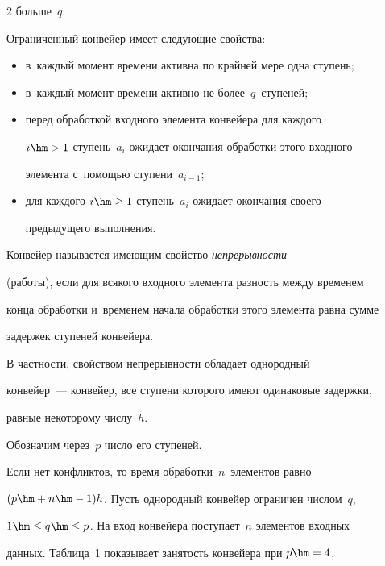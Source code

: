 \begin{multicols}{2}
больше~$q$. 


  


  Ограниченный конвейер имеет следующие свойства:


  \begin{itemize}


\item в~каждый момент времени активна по крайней мере одна ступень;


\item в~каждый момент времени активно не более~$q$~ступеней;


\item перед обработкой входного элемента конвейера для каждого 


$i\hm>1$ ступень~$a_i$ ожидает окончания обработки этого входного 


элемента с~помощью ступени~$a_{i-1}$; 


\item для каждого $i\hm\geq 1$ ступень~$a_i$ ожидает окончания своего 


предыдущего выполнения.


\end{itemize}





  Конвейер называется имеющим свойство \textit{непрерывности} 


(работы), если для всякого входного элемента разность между временем 


конца обработки и~временем начала обработки этого элемента равна сумме 


задержек ступеней конвейера. 




  В част\-ности, свойством непрерывности обладает однородный  


конвейер~--- конвейер, все ступени которого имеют одинаковые задержки, 


равные некоторому числу~$h$.





 Обозначим через~$p$ число его ступеней. 


Если нет конфликтов, то время обработки~$n$~элементов равно 


$(p\hm+n\hm-1)h$. Пусть однородный конвейер ограничен числом~$q$, 


$1\hm\leq q\hm\leq p$. На вход конвейера поступает~$n$ элементов входных 


данных. Таблица~1 показывает занятость конвейера при $p\hm=4$, 



\end{multicols}
